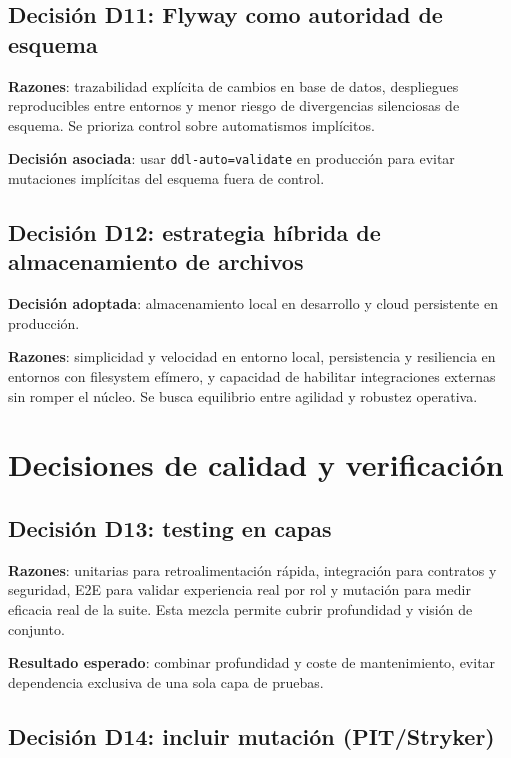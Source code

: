 \subsection{Decisi\'on D11: Flyway como autoridad de esquema}

\textbf{Razones}: trazabilidad expl\'icita de cambios en base de datos, despliegues reproducibles entre entornos y menor riesgo de divergencias silenciosas de esquema. Se prioriza control sobre automatismos impl\'icitos.

\textbf{Decisi\'on asociada}:
usar \texttt{ddl-auto=validate} en producci\'on para evitar
mutaciones impl\'icitas del esquema fuera de control.

\subsection{Decisi\'on D12: estrategia h\'ibrida de almacenamiento de archivos}

\textbf{Decisi\'on adoptada}:
almacenamiento local en desarrollo y cloud persistente en producci\'on.

\textbf{Razones}: simplicidad y velocidad en entorno local, persistencia y resiliencia en entornos con filesystem ef\'imero, y capacidad de habilitar integraciones externas sin romper el n\'ucleo. Se busca equilibrio entre agilidad y robustez operativa.

\FloatBarrier
\section{Decisiones de calidad y verificaci\'on}

\subsection{Decisi\'on D13: testing en capas}

\textbf{Razones}: unitarias para retroalimentaci\'on r\'apida, integraci\'on para contratos y seguridad, E2E para validar experiencia real por rol y mutaci\'on para medir eficacia real de la suite. Esta mezcla permite cubrir profundidad y visi\'on de conjunto.

\textbf{Resultado esperado}:
combinar profundidad y coste de mantenimiento,
evitar dependencia exclusiva de una sola capa de pruebas.

\subsection{Decisi\'on D14: incluir mutaci\'on (PIT/Stryker)}

